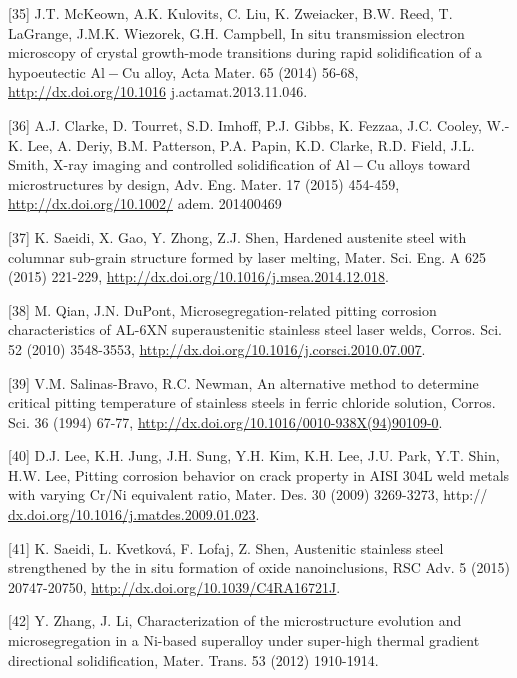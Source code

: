 \documentclass[10pt]{article}
\begin{document}
[35] J.T. McKeown, A.K. Kulovits, C. Liu, K. Zweiacker, B.W. Reed, T. LaGrange, J.M.K. Wiezorek, G.H. Campbell, In situ transmission electron microscopy of crystal growth-mode transitions during rapid solidification of a hypoeutectic $\mathrm{Al}-\mathrm{Cu}$ alloy, Acta Mater. 65 (2014) 56-68, \href{http://dx.doi.org/10.1016}{http://dx.doi.org/10.1016} j.actamat.2013.11.046.

[36] A.J. Clarke, D. Tourret, S.D. Imhoff, P.J. Gibbs, K. Fezzaa, J.C. Cooley, W.-K. Lee, A. Deriy, B.M. Patterson, P.A. Papin, K.D. Clarke, R.D. Field, J.L. Smith, X-ray imaging and controlled solidification of $\mathrm{Al}-\mathrm{Cu}$ alloys toward microstructures by design, Adv. Eng. Mater. 17 (2015) 454-459, \href{http://dx.doi.org/10.1002/}{http://dx.doi.org/10.1002/} adem. 201400469

[37] K. Saeidi, X. Gao, Y. Zhong, Z.J. Shen, Hardened austenite steel with columnar sub-grain structure formed by laser melting, Mater. Sci. Eng. A 625 (2015) 221-229, \href{http://dx.doi.org/10.1016/j.msea.2014.12.018}{http://dx.doi.org/10.1016/j.msea.2014.12.018}.

[38] M. Qian, J.N. DuPont, Microsegregation-related pitting corrosion characteristics of AL-6XN superaustenitic stainless steel laser welds, Corros. Sci. 52 (2010) 3548-3553, \href{http://dx.doi.org/10.1016/j.corsci.2010.07.007}{http://dx.doi.org/10.1016/j.corsci.2010.07.007}.

[39] V.M. Salinas-Bravo, R.C. Newman, An alternative method to determine critical pitting temperature of stainless steels in ferric chloride solution, Corros. Sci. 36 (1994) 67-77, \href{http://dx.doi.org/10.1016/0010-938X(94)90109-0}{http://dx.doi.org/10.1016/0010-938X(94)90109-0}.

[40] D.J. Lee, K.H. Jung, J.H. Sung, Y.H. Kim, K.H. Lee, J.U. Park, Y.T. Shin, H.W. Lee, Pitting corrosion behavior on crack property in AISI 304L weld metals with varying $\mathrm{Cr} / \mathrm{Ni}$ equivalent ratio, Mater. Des. 30 (2009) 3269-3273, http:// \href{http://dx.doi.org/10.1016/j.matdes.2009.01.023}{dx.doi.org/10.1016/j.matdes.2009.01.023}.

[41] K. Saeidi, L. Kvetková, F. Lofaj, Z. Shen, Austenitic stainless steel strengthened by the in situ formation of oxide nanoinclusions, RSC Adv. 5 (2015) 20747-20750, \href{http://dx.doi.org/10.1039/C4RA16721J}{http://dx.doi.org/10.1039/C4RA16721J}.

[42] Y. Zhang, J. Li, Characterization of the microstructure evolution and microsegregation in a Ni-based superalloy under super-high thermal gradient directional solidification, Mater. Trans. 53 (2012) 1910-1914.
\end{document}
